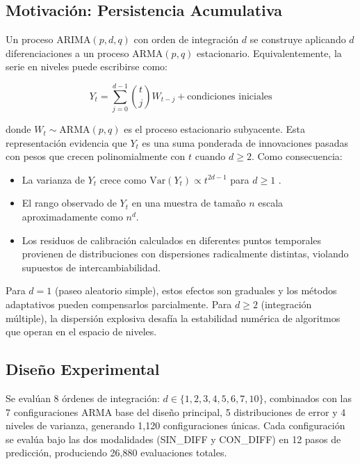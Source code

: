 \subsection{Motivación: Persistencia Acumulativa}
\label{subsec:motivacion_multi_d}

Un proceso ARIMA$(p,d,q)$ con orden de integración $d$ se construye aplicando $d$ diferenciaciones a un proceso ARMA$(p,q)$ estacionario. Equivalentemente, la serie en niveles puede escribirse como:

\begin{equation}
Y_t = \sum_{j=0}^{d-1} \binom{t}{j} W_{t-j} + \text{condiciones iniciales}
\end{equation}

donde $W_t \sim \text{ARMA}(p,q)$ es el proceso estacionario subyacente. Esta representación evidencia que $Y_t$ es una suma ponderada de innovaciones pasadas con pesos que crecen polinomialmente con $t$ cuando $d \geq 2$. Como consecuencia:

\begin{itemize}
\item La varianza de $Y_t$ crece como $\text{Var}(Y_t) \propto t^{2d-1}$ para $d \geq 1$ \parencite{Box2015}.
\item El rango observado de $Y_t$ en una muestra de tamaño $n$ escala aproximadamente como $n^d$.
\item Los residuos de calibración calculados en diferentes puntos temporales provienen de distribuciones con dispersiones radicalmente distintas, violando supuestos de intercambiabilidad.
\end{itemize}

Para $d = 1$ (paseo aleatorio simple), estos efectos son graduales y los métodos adaptativos pueden compensarlos parcialmente. Para $d \geq 2$ (integración múltiple), la dispersión explosiva desafía la estabilidad numérica de algoritmos que operan en el espacio de niveles.

\subsection{Diseño Experimental}
\label{subsec:diseño_multi_d}

Se evalúan 8 órdenes de integración: $d \in \{1, 2, 3, 4, 5, 6, 7, 10\}$, combinados con las 7 configuraciones ARMA base del diseño principal, 5 distribuciones de error y 4 niveles de varianza, generando 1,120 configuraciones únicas. Cada configuración se evalúa bajo las dos modalidades (SIN\_DIFF y CON\_DIFF) en 12 pasos de predicción, produciendo 26,880 evaluaciones totales.

